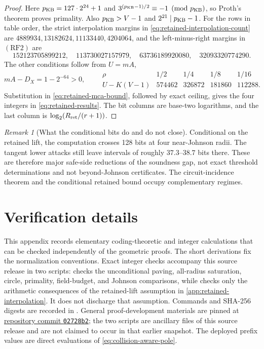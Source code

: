 \documentclass[11pt,a4paper]{amsart}
\numberwithin{equation}{section}
\theoremstyle{remark}
\newtheorem{remark}[remark]{Remark}
\begin{document}
\begin{proof}
Here \(p_{\rm KB}=127\cdot2^{24}+1\) and
\(3^{(p_{\rm KB}-1)/2}\equiv-1\pmod {p_{\rm KB}}\), so Proth's
theorem proves primality.  Also \(p_{\rm KB}>V-1\) and
\(2^{21}\mid p_{\rm KB}-1\).
For the rows in table order, the strict interpolation margins in
\eqref{eq:retained-interpolation-count} are
\(4889934,13182624,11133440,4204064\), and the left-minus-right margins in
\((\mathrm{RF2})\) are
\[
152123705899212,\quad113730027157979,\quad
63736189920080,\quad32093320774290.
\]
The other conditions follow from \(U=mA\),
\[
 mA-D_X=1-2^{-64}>0,\qquad
 \begin{array}{c|rrrr}
 \rho&1/2&1/4&1/8&1/16\\ \hline
 U-K(V-1)&574462&326872&181860&112288.
 \end{array}
\]
Substitution in \eqref{eq:retained-mca-bound}, followed by exact ceiling,
gives the four integers in \eqref{eq:retained-results}.  The bit columns
are base-two logarithms, and the last column is
\(\log_2(R_{\rm ret}/(r+1))\).
\end{proof}

\begin{remark}[What the conditional bits do and do not close]
Conditional on the retained lift, the computation crosses 128 bits at
four near-Johnson radii.  The tangent lower attacks still leave intervals of
roughly \(37.3\)--\(38.7\) bits there.  These are therefore major
safe-side reductions of the soundness gap, not exact threshold
determinations and not beyond-Johnson certificates.  The circuit-incidence theorem
and the conditional retained bound occupy complementary regimes.
\end{remark}


\section{Verification details}\label{app:verification}

This appendix records elementary coding-theoretic and integer calculations
that can be checked independently of the geometric proofs.  The short
derivations fix the normalization conventions.  Exact integer checks
accompany this source release in two scripts:
 checks the
unconditional paving, all-radius saturation, circle, primality,
field-budget, and Johnson
comparisons, while  checks only the
arithmetic consequences of the retained-lift assumption in
\cref{app:retained-interpolation}.  It does not discharge that assumption.
Commands and SHA-256 digests are recorded in
.  General proof-development materials are
pinned at
\href{https://github.com/przchojecki/rs-mca/tree/02728b208ea785d02115ea967236aebf653b31ec}
{repository commit \texttt{02728b2}}; the two scripts are ancillary files
of this source release and are not claimed to occur in that earlier snapshot.
The deployed prefix values are direct evaluations of
\eqref{eq:collision-aware-pole}.
\end{document}
